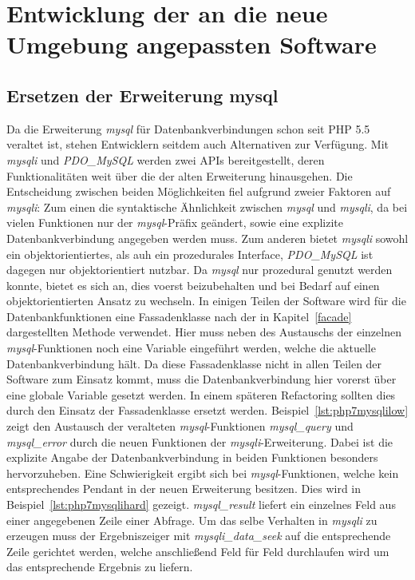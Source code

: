 \section{Entwicklung der an die neue Umgebung angepassten Software}\label{develop}

    \subsection{Ersetzen der Erweiterung mysql}\label{mysql}
    Da die Erweiterung \textit{mysql} für Datenbankverbindungen schon seit \ac{PHP} 5.5 veraltet ist, stehen Entwicklern seitdem auch Alternativen zur Verfügung. Mit \textit{mysqli} und 
    \textit{PDO\_MySQL} werden zwei \acp{API} bereitgestellt, deren Funktionalitäten weit über die der alten Erweiterung hinausgehen. Die Entscheidung zwischen 
    beiden Möglichkeiten fiel aufgrund zweier Faktoren auf \textit{mysqli}: Zum einen die syntaktische Ähnlichkeit zwischen \textit{mysql} und \textit{mysqli}, 
    da bei vielen Funktionen nur der \textit{mysql}-Präfix geändert, sowie eine explizite Datenbankverbindung angegeben werden muss. Zum anderen bietet \textit{mysqli} 
    sowohl ein objektorientiertes, als auh ein prozedurales Interface, \textit{PDO\_MySQL} ist dagegen nur objektorientiert nutzbar. Da \textit{mysql} nur 
    prozedural genutzt werden konnte, bietet es sich an, dies voerst beizubehalten und bei Bedarf auf einen objektorientierten Ansatz zu wechseln.
    In einigen Teilen der Software wird für die Datenbankfunktionen eine Fassadenklasse nach der in Kapitel~\ref{facade} 
    dargestellten Methode verwendet. Hier muss neben des Austauschs der einzelnen \textit{mysql}-Funktionen noch eine 
    Variable eingeführt werden, welche die aktuelle Datenbankverbindung hält.
    Da diese Fassadenklasse nicht in allen Teilen der Software zum Einsatz kommt, muss die Datenbankverbindung hier vorerst 
    über eine globale Variable gesetzt werden. In einem späteren Refactoring sollten dies durch den Einsatz der Fassadenklasse 
    ersetzt werden. Beispiel~\ref{lst:php7mysqlilow} zeigt den Austausch der veralteten \textit{mysql}-Funktionen \textit{mysql\_query} und \textit{mysql\_error} 
    durch die neuen Funktionen der \textit{mysqli}-Erweiterung. Dabei ist die explizite Angabe der Datenbankverbindung in beiden Funktionen besonders hervorzuheben. 
    Eine Schwierigkeit ergibt sich bei \textit{mysql}-Funktionen, welche kein entsprechendes Pendant in der neuen Erweiterung besitzen. Dies wird in Beispiel~\ref{lst:php7mysqlihard} 
    gezeigt. \textit{mysql\_result} liefert ein einzelnes Feld aus einer angegebenen Zeile einer Abfrage. Um das selbe Verhalten in \textit{mysqli} zu erzeugen muss 
    der Ergebniszeiger mit \textit{mysqli\_data\_seek} auf die entsprechende Zeile gerichtet werden, welche anschließend Feld für Feld durchlaufen wird um das entsprechende 
    Ergebnis zu liefern.


